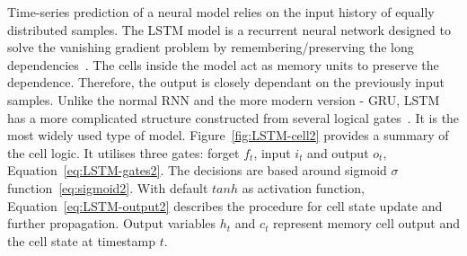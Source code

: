 Time-series prediction of a neural model relies on the input history of equally distributed samples.
The LSTM model is a recurrent neural network designed to solve the vanishing gradient problem by remembering/preserving the long dependencies~\cite{rasifaghihi_predictive_2020}.
The cells inside the model act as memory units to preserve the dependence.
Therefore, the output is closely dependant on the previously input samples.
Unlike the normal RNN and the more modern version - GRU, LSTM has a more complicated structure constructed from several logical gates~\cite{LSTM_Hochreiter1997}.
It is the most widely used type of model.
\mbox{Figure~\ref{fig:LSTM-cell2}} provides a summary of the cell logic.
It utilises three gates: forget $f_t$, input $i_t$ and output $o_t$, \mbox{Equation~\ref{eq:LSTM-gates2}}.
The decisions are based around sigmoid $\sigma$ function~\ref{eq:sigmoid2}.
With default $tanh$ as activation function, \mbox{Equation~\ref{eq:LSTM-output2}} describes the procedure for cell state update and further propagation.
Output variables $h_t$ and $c_t$ represent memory cell output and the cell state at timestamp $t$.


